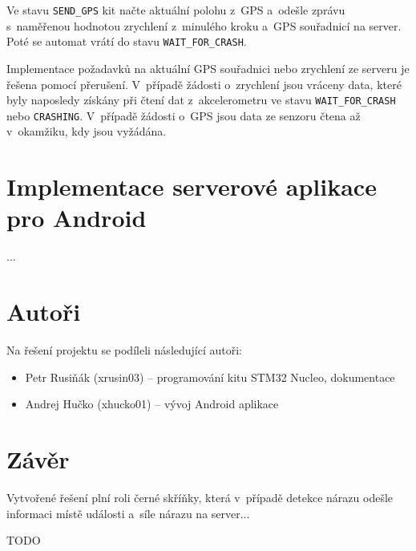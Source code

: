 \documentclass[a4paper,11pt,titlepage]{article}
\begin{document}
Ve stavu \texttt{SEND\_GPS} kit načte aktuální polohu z~GPS a~odešle zprávu s~naměřenou hodnotou
zrychlení z~minulého kroku a~GPS souřadnicí na server. Poté se automat vrátí do stavu
\texttt{WAIT\_FOR\_CRASH}.

Implementace požadavků na aktuální GPS souřadnici nebo zrychlení ze serveru
je řešena pomocí přerušení. V~případě žádosti o~zrychlení jsou vráceny data,
které byly naposledy získány při čtení dat z~akcelerometru ve stavu \texttt{WAIT\_FOR\_CRASH}
nebo \texttt{CRASHING}. V~případě žádosti o~GPS jsou data ze senzoru čtena až v~okamžiku,
kdy jsou vyžádána.

\section{Implementace serverové aplikace pro Android}

...

\section{Autoři}

Na řešení projektu se podíleli následující autoři:

\begin{itemize}
\item Petr Rusiňák (xrusin03) -- programování kitu STM32 Nucleo, dokumentace
\item Andrej Hučko (xhucko01) -- vývoj Android aplikace
\end{itemize}

\section{Závěr}

Vytvořené řešení plní roli černé skříňky, která v~případě detekce nárazu odešle
informaci místě události a~síle nárazu na server...

TODO
\end{document}
